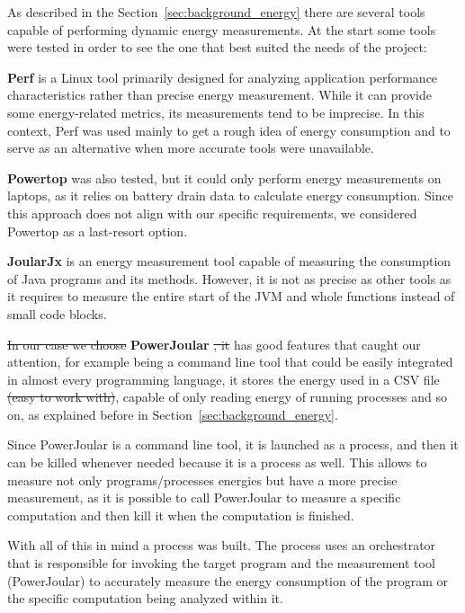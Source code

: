 As described in the Section~\ref{sec:background_energy} there are several tools capable of performing dynamic energy measurements.
At the start some tools were tested in order to see the one that best suited the needs of the project:

\textbf{Perf} is a Linux tool primarily designed for analyzing application performance characteristics rather than precise energy measurement. While it can provide some energy-related metrics, its measurements tend to be imprecise. In this context, Perf was used mainly to get a rough idea of energy consumption and to serve as an alternative when more accurate tools were unavailable.

\textbf{Powertop} was also tested, but it could only perform energy measurements on laptops, as it relies on battery drain data to calculate energy consumption. Since this approach does not align with our specific requirements, we considered Powertop as a last-resort option.

\textbf{JoularJx} is an energy measurement tool capable of measuring the consumption of Java programs and its methods. However, it is not as precise as other tools as it requires to measure the entire start of the JVM and whole functions instead of small code blocks.


\st{In our case we choose} \textbf{PowerJoular} \st{, it} has good features that caught our attention, for example being a command line tool that could be easily integrated in almost every programming language, it stores the energy used in a CSV file \st{(easy to work with)}, capable of only reading energy of running processes and so on, as explained before in Section~\ref{sec:background_energy}.

Since PowerJoular is a command line tool, it is launched as a process, and then it can be killed whenever needed because it is a process as well. This allows to measure not only programs/processes energies but have a more precise measurement, as it is possible to call PowerJoular to measure a specific computation and then kill it when the computation is finished.

With all of this in mind a process was built. The process uses an orchestrator that is responsible for invoking the target program and the measurement tool (PowerJoular) to accurately measure the energy consumption of the program or the specific computation being analyzed within it.


